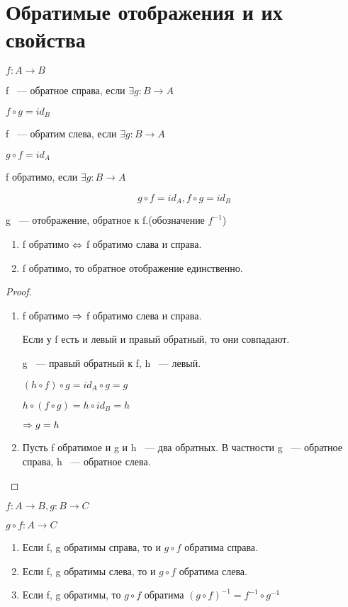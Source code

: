 ﻿\section{Обратимые отображения и их свойства}

$f: A \to B$

\begin{Def}
f ~--- обратное справа, если $\exists g: B \to A$

$f \circ g = id_B$

f ~--- обратим слева, если $\exists g: B \to A$

$g \circ f = id_A$

f обратимо, если $\exists g: B \to A$

$$g \circ f = id_A, f \circ g = id_B$$

g ~--- отображение, обратное к f.(обозначение $f^{-1}$)
\end{Def}

\begin{theorem}{}

\begin{enumerate}
\item f обратимо $\Leftrightarrow$ f обратимо слава и справа.
\item f обратимо, то обратное отображение единственно.
\end{enumerate}

\end{theorem}

\begin{proof}
\begin{enumerate}
\item f обратимо $\Rightarrow$ f обратимо слева и справа.

Если у f есть и левый и правый обратный, то они совпадают. 

g ~--- правый обратный к f, h ~--- левый.

$(h \circ f) \circ g = id_A \circ g = g$

$h \circ (f \circ g) = h \circ id_B = h$

$\Rightarrow g = h$

\item Пусть f обратимое и g и h ~--- два обратных. В частности g ~--- обратное справа, h ~--- обратное слева.
\end{enumerate}
\end{proof}

\begin{theorem}{}
$f:A \to B, g:B \to C$

$g \circ f: A \to C$

\begin{enumerate}
\item Если f, g обратимы справа, то и $g \circ f$ обратима справа.
\item Если f, g обратимы слева, то и $g \circ f$ обратима слева.
\item Если f, g обратимы, то $g \circ f$ обратима $(g \circ f)^{-1} = f^{-1} \circ g^{-1}$
\end{enumerate}
\end{theorem}

